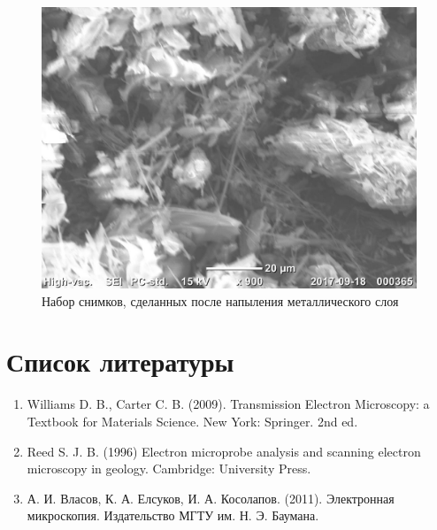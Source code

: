 \documentclass[12pt]{article}
\begin{document}
\begin{figure}[!ht]
	\includegraphics[scale=0.7]{pictures/20170918_000365.jpg}
	\caption{Набор снимков, сделанных после напыления металлического слоя}
\end{figure}

\clearpage
\section*{Список литературы}

\begin{enumerate}
	\item Williams D. B., Carter C. B. (2009). Transmission Electron Microscopy: a Textbook for Materials Science. New York: Springer. 2nd ed.
	\item Reed S. J. B. (1996) Electron microprobe analysis and scanning electron microscopy in geology. Cambridge: University Press.
	\item А. И. Власов, К. А. Елсуков, И. А. Косолапов. (2011). Электронная микроскопия. Издательство МГТУ им. Н. Э. Баумана. 
\end{enumerate}
\end{document}
